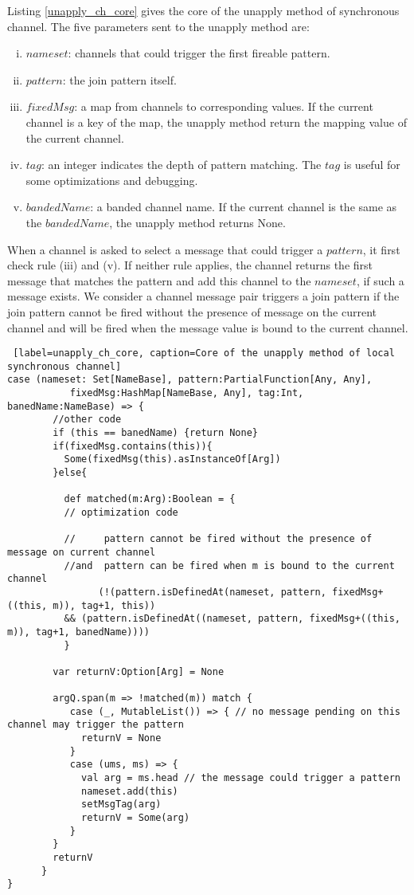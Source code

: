 Listing \ref{unapply_ch_core} gives the core of the unapply method of synchronous channel.  The five parameters sent to the unapply method are:

\begin{enumerate} [(i)]
  \item $nameset$: channels that could trigger the first fireable pattern.
  \item $pattern$: the join pattern itself.
  \item $fixedMsg$: a map from channels to corresponding values.  If the current channel is a key of the map, the unapply method return the mapping value of the current channel.
  \item $tag$: an integer indicates the depth of pattern matching.  The $tag$ is useful for some optimizations and debugging.
  \item $bandedName$: a banded channel name.  If the current channel is the same as the $bandedName$, the unapply method returns None.
\end{enumerate}

When a channel is asked to select a message that could trigger a $pattern$, it first check rule (iii) and (v).  If neither rule applies, the channel returns the first message that matches the pattern and add this channel to the $nameset$, if such a message exists.  We consider a channel message pair triggers a join pattern if the join pattern cannot be fired without the presence of message on the current channel and will be fired when the message value is bound to the current channel.

\begin{lstlisting} [label=unapply_ch_core, caption=Core of the unapply method of local synchronous channel]
case (nameset: Set[NameBase], pattern:PartialFunction[Any, Any], 
           fixedMsg:HashMap[NameBase, Any], tag:Int, banedName:NameBase) => {
        //other code
        if (this == banedName) {return None}      
        if(fixedMsg.contains(this)){
          Some(fixedMsg(this).asInstanceOf[Arg])
        }else{
        
          def matched(m:Arg):Boolean = {
          // optimization code
          
          //     pattern cannot be fired without the presence of message on current channel  
          //and  pattern can be fired when m is bound to the current channel 
                (!(pattern.isDefinedAt(nameset, pattern, fixedMsg+((this, m)), tag+1, this))
          && (pattern.isDefinedAt((nameset, pattern, fixedMsg+((this, m)), tag+1, banedName))))
          }
                
        var returnV:Option[Arg] = None

        argQ.span(m => !matched(m)) match {
           case (_, MutableList()) => { // no message pending on this channel may trigger the pattern
             returnV = None
           }
           case (ums, ms) => {
             val arg = ms.head // the message could trigger a pattern
             nameset.add(this)
             setMsgTag(arg)
             returnV = Some(arg)
           }
        }
        returnV
      }
}
\end{lstlisting}

